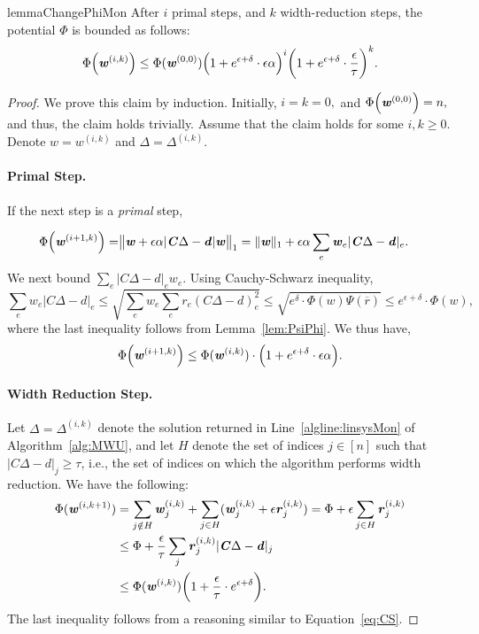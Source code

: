 \documentclass[11pt]{article}
\renewcommand{\norm}[1]{\ensuremath{\left\lVert #1 \right\rVert}}
\let\originalleft\left
\let\originalright\right
\renewcommand{\left}{\mathopen{}\mathclose\bgroup\originalleft}
\renewcommand{\right}{\aftergroup\egroup\originalright}
\newcommand\dd{\boldsymbol{\mathit{d}}}
\newcommand\rr{\boldsymbol{\mathit{r}}}
\newcommand\ww{\boldsymbol{\mathit{w}}}
\newcommand\rrbar{\overline{\boldsymbol{\mathit{r}}}}
\newcommand\CC{\boldsymbol{\mathit{C}}}
\begin{document}
\begin{restatable}{lemma}{ChangePhiMon}
  \label{lem:ChangePhiMon}
  After $i$ primal steps, and $k$ width-reduction steps,
  the potential $\Phi$ is bounded as follows:
  \begin{align*}
 \Phi\left(\ww^{(i,k)}\right) \leq \Phi(\ww^{(0,0)})\left(1+e^{\epsilon + \delta} \cdot \epsilon\alpha\right)^i \left(1+ e^{\epsilon + \delta} \cdot \frac{\epsilon}{\tau} \right)^k .
 \end{align*}
\end{restatable}
\begin{proof}
  We prove this claim by induction. Initially, $i = k = 0,$
  and $\Phi\left(\ww^{(0,0)}\right) = n,$ and thus, the claim holds trivially. Assume that the claim holds for some $i,k \ge 0$. Denote $\ww = \ww^{(i,k)}$ and $\Delta = \Delta^{(i,k)}$.
\paragraph*{Primal Step.} If the next step is a \emph{primal} step, 

\begin{align*}
\Phi\left(\ww^{( i+1,k)} \right) = &\norm{ \ww+ \epsilon\alpha |\CC\Delta-\dd|\ww}_1 = \|\ww\|_1 + \epsilon\alpha \sum_e \ww_e|\CC\Delta-\dd|_e.
\end{align*}
We next bound $\sum_e |\CC\Delta-\dd|_e\ww_e$.
Using Cauchy-Schwarz inequality,
\begin{equation}\label{eq:CS}
 \sum_e \ww_e |\CC\Delta-\dd|_e  \leq \sqrt{\sum_e \ww_e \sum_e \rr_e(\CC\Delta-\dd)^2_e} \leq \sqrt{e^{\delta} \cdot \Phi(\ww)\Psi(\rrbar)} \leq e^{\epsilon + \delta} \cdot \Phi(\ww),
\end{equation}
where the last inequality follows from Lemma~\ref{lem:PsiPhi}.
We thus have,
\begin{align*}
 \Phi\left(\ww^{( i+1,k)} \right) \leq \Phi(\ww^{(i,k)})\cdot \left(1 + e^{\epsilon + \delta} \cdot \epsilon\alpha\right).
\end{align*}

 \paragraph*{Width Reduction Step.}
Let $\Delta = \Delta^{(i,k)}$ denote the solution returned in Line~\ref{algline:linsysMon} of Algorithm~\ref{alg:MWU}, and let $H$ denote the set of indices $j \in [n]$ such that $|\CC\Delta-\dd|_j \geq \tau $, i.e., the set of indices on which the algorithm performs width reduction.
 We have the following:
\begin{align*}
\Phi(\ww^{(i,k+1)}) & = \sum_{j \notin H}  \ww_j^{(i,k)} + \sum_{j \in H}(\ww_j^{(i,k)} + \epsilon \rr_j^{(i,k)})   =\Phi  + \epsilon \sum_{j \in H}  \rr_j^{(i,k)} \\
&\leq \Phi + \frac{\epsilon}{\tau} \sum_j \rr_j^{(i,k)}|\CC\Delta-\dd|_j \\
&\leq \Phi(\ww^{(i,k)})\left(1 + \frac{\epsilon}{\tau} \cdot e^{\epsilon + \delta} \right).
\end{align*}
The last inequality follows from a reasoning similar to Equation~\eqref{eq:CS}.
\end{proof}
\end{document}
